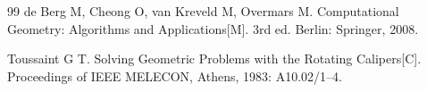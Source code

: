 \begin{thebibliography}{99}
  de Berg M, Cheong O, van Kreveld M, Overmars M.
  Computational Geometry: Algorithms and Applications[M].
  3rd ed. Berlin: Springer, 2008.

  Toussaint G T.
  Solving Geometric Problems with the Rotating Calipers[C].
  Proceedings of IEEE MELECON, Athens, 1983: A10.02/1--4.
\end{thebibliography}

